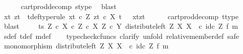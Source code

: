 \begin{isabellebody}
\ \ \ \ \isamarkupfalse%
\ cart{\isacharunderscore}{\kern0pt}prod{\isacharunderscore}{\kern0pt}decomp\ s{\isacharunderscore}{\kern0pt}type\ \isamarkupfalse%
\ blast\isanewline
\ \ \isamarkupfalse%
\ xt\ zt\ \ t{\isacharunderscore}{\kern0pt}def{\isacharbrackleft}{\kern0pt}type{\isacharunderscore}{\kern0pt}rule{\isacharbrackright}{\kern0pt}{\isacharcolon}{\kern0pt}\ {\isachardoublequoteopen}xt\ {\isasymin}\isactrlsub c\ Z{\isachardoublequoteclose}\ {\isachardoublequoteopen}zt\ {\isasymin}\isactrlsub c\ X{\isachardoublequoteclose}\ {\isachardoublequoteopen}t\ {\isacharequal}{\kern0pt}\ \ {\isasymlangle}xt{\isacharcomma}{\kern0pt}zt{\isasymrangle}{\isachardoublequoteclose}\isanewline
\ \ \ \ \isamarkupfalse%
\ cart{\isacharunderscore}{\kern0pt}prod{\isacharunderscore}{\kern0pt}decomp\ t{\isacharunderscore}{\kern0pt}type\ \isamarkupfalse%
\ blast\ \isanewline
\isanewline
\ \ \isamarkupfalse%
\ {\isachardoublequoteopen}{\isasymlangle}t{\isacharcomma}{\kern0pt}s{\isasymrangle}\ {\isasymin}\isactrlbsub {\isacharparenleft}{\kern0pt}Z\ {\isasymtimes}\isactrlsub c\ X{\isacharparenright}{\kern0pt}\ {\isasymtimes}\isactrlsub c\ {\isacharparenleft}{\kern0pt}Z\ {\isasymtimes}\isactrlsub c\ X{\isacharparenright}{\kern0pt}\isactrlesub \ {\isacharparenleft}{\kern0pt}Z\ {\isasymtimes}\isactrlsub c\ Y{\isacharcomma}{\kern0pt}\ distribute{\isacharunderscore}{\kern0pt}left\ Z\ X\ X\ \ {\isasymcirc}\isactrlsub c\ {\isacharparenleft}{\kern0pt}id\isactrlsub c\ Z\ {\isasymtimes}\isactrlsub f\ m{\isacharparenright}{\kern0pt}{\isacharparenright}{\kern0pt}{\isachardoublequoteclose}\ \isanewline
\ \ \ \ \isamarkupfalse%
\ s{\isacharunderscore}{\kern0pt}def\ t{\isacharunderscore}{\kern0pt}def\ m{\isacharunderscore}{\kern0pt}def\isanewline
\ \ \isamarkupfalse%
\ {\isacharparenleft}{\kern0pt}typecheck{\isacharunderscore}{\kern0pt}cfuncs{\isacharcomma}{\kern0pt}\ clarify{\isacharcomma}{\kern0pt}\ unfold\ relative{\isacharunderscore}{\kern0pt}member{\isacharunderscore}{\kern0pt}def{}{\isacharcomma}{\kern0pt}\ safe{\isacharparenright}{\kern0pt}\isanewline
\ \ \ \ \isamarkupfalse%
\ {\isachardoublequoteopen}monomorphism\ {\isacharparenleft}{\kern0pt}distribute{\isacharunderscore}{\kern0pt}left\ Z\ X\ X\ \ {\isasymcirc}\isactrlsub c\ {\isacharparenleft}{\kern0pt}id\isactrlsub c\ Z\ {\isasymtimes}\isactrlsub f\ m{\isacharparenright}{\kern0pt}{\isacharparenright}{\kern0pt}{\isachardoublequoteclose}\isanewline
\ \ \ \ \ \ \isamarkupfalse%

\end{isabellebody}
